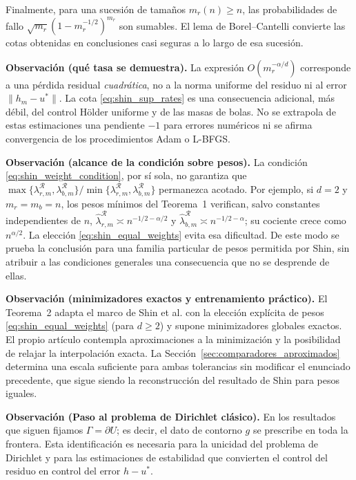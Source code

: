 Finalmente, para una sucesión de tamaños $m_r(n)\geq n$, las probabilidades
de fallo $\sqrt{m_r}(1-m_r^{-1/2})^{m_r}$ son sumables. El lema de
Borel--Cantelli convierte las cotas obtenidas en conclusiones casi seguras
a lo largo de esa sucesión.

\medskip
\noindent\textbf{Observación (qué tasa se demuestra).}
La expresión $O(m_r^{-\alpha/d})$ corresponde a una pérdida residual
\emph{cuadrática}, no a la norma uniforme del residuo ni al error
$\|h_m-u^*\|$. La cota \eqref{eq:shin_sup_rates} es una consecuencia
adicional, más débil, del control Hölder uniforme y de las masas de bolas.
No se extrapola de estas estimaciones una pendiente $-1$ para errores
numéricos ni se afirma convergencia de los procedimientos Adam o L-BFGS.

\medskip
\noindent\textbf{Observación (alcance de la condición sobre pesos).}
La condición \eqref{eq:shin_weight_condition}, por sí sola, no garantiza que
$\max\{\lambda_{r,m}^{\mathcal R},\lambda_{b,m}^{\mathcal R}\}/
\min\{\lambda_{r,m}^{\mathcal R},\lambda_{b,m}^{\mathcal R}\}$ permanezca
acotado. Por ejemplo, si $d=2$ y $m_r=m_b=n$, los pesos mínimos del
Teorema~1 verifican, salvo constantes independientes de $n$,
$\hat\lambda_{r,m}^{\mathcal R}\asymp n^{-1/2-\alpha/2}$ y
$\hat\lambda_{b,m}^{\mathcal R}\asymp n^{-1/2-\alpha}$;
su cociente crece como $n^{\alpha/2}$. La elección
\eqref{eq:shin_equal_weights} evita esa dificultad. De este modo se prueba
la conclusión para una familia particular de pesos permitida por Shin, sin
atribuir a las condiciones generales una consecuencia que no se desprende de ellas.

\medskip
\par\medskip
\noindent\textbf{Observación (minimizadores exactos y entrenamiento práctico).}
El Teorema~2 adapta el marco de Shin et al. con la elección explícita de pesos \eqref{eq:shin_equal_weights} (para $d\geq2$) y supone minimizadores globales exactos. El propio artículo contempla aproximaciones a la minimización y la posibilidad de relajar la interpolación exacta. La Sección~\ref{sec:comparadores_aproximados} determina una escala suficiente para ambas tolerancias sin modificar el enunciado precedente, que sigue siendo la reconstrucción del resultado de Shin para pesos iguales.
\par\medskip
\noindent\textbf{Observación (Paso al problema de Dirichlet clásico).}
En los resultados que siguen fijamos $\Gamma=\partial U$; es decir, el dato de contorno $g$ se prescribe en toda la frontera.
Esta identificación es necesaria para la unicidad del problema de Dirichlet y para las estimaciones de estabilidad que
convierten el control del residuo en control del error $h-u^*$.
\medskip



